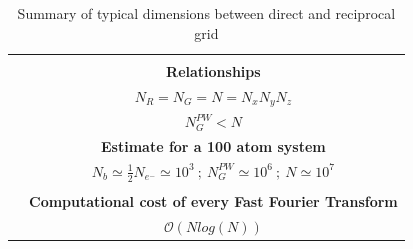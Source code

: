 \documentclass[a4paper,12pt]{article}
\begin{document}
\begin{table}[]
\begin{tabular}{lc}
                                    & \multicolumn{1}{l}{}                                                                                                                                             \\ \cline{2-2} 
\multicolumn{1}{l|}{}               & \multicolumn{1}{c|}{\textbf{Relationships}}                                                                                                                      \\ \cline{2-2} 
\multicolumn{1}{l|}{}               & \multicolumn{1}{c|}{$N_{R} = N_{G} = N = N_x N_y N_z$}                                                                                                                         \\ \cline{2-2} 
\multicolumn{1}{l|}{}               & \multicolumn{1}{c|}{$N_{G}^{PW} < N$}                                                                                                                       \\ \cline{2-2} 
\multicolumn{1}{l|}{}               & \multicolumn{1}{c|}{\textbf{Estimate for a 100 atom system}}                                                                                                                       \\ \cline{2-2} 
\multicolumn{1}{l|}{}               & \multicolumn{1}{c|}{ $N_{b} \simeq \frac{1}{2} N_{e^{-}} \simeq 10^3~;~ N_{G}^{PW} \simeq 10^{6} ~;~ N \simeq 10^7 $}                                                                                                                       \\ \cline{2-2} 
                                    &                                                                                                                                                                  \\ \cline{2-2} 
\multicolumn{1}{l|}{}               & \multicolumn{1}{c|}{\textbf{Computational cost of every Fast Fourier Transform}}                                                                                           \\ \cline{2-2} 
\multicolumn{1}{l|}{}               & \multicolumn{1}{c|}{$\mathcal{O}(N log (N))$}                                                                                                                    \\ \cline{2-2} 
\end{tabular}
\caption{Summary of typical dimensions between direct and reciprocal grid}
\label{tab:FFTSummary}
\end{table}
\end{document}
